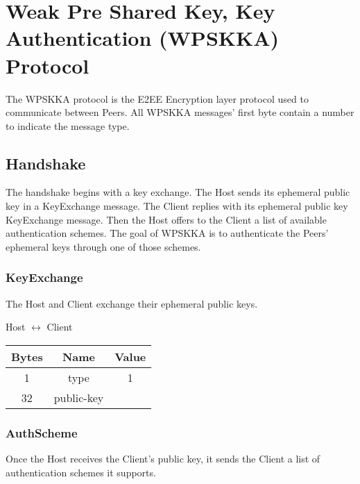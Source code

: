 \section{Weak Pre Shared Key, Key Authentication (WPSKKA) Protocol}

The WPSKKA protocol is the E2EE Encryption layer protocol used to communicate between Peers. All WPSKKA messages'
first byte contain a number to indicate
the message type.\\

\subsection{Handshake}

The handshake begins with a key exchange.
The Host sends its ephemeral public key in a KeyExchange message.
The Client replies with its ephemeral public key KeyExchange message.
Then the Host offers to the Client a list of available authentication schemes.
The goal of WPSKKA is to authenticate the Peers' ephemeral keys through one of those schemes.

\subsubsection{KeyExchange}

The Host and Client exchange their ephemeral public keys.

\begin{center}
    Host $\leftrightarrow$ Client\\
    \begin{tabular}{|c|c|c|}
        \hline
        \textbf{Bytes} & \textbf{Name} & \textbf{Value} \\
        \hline
        1              & type          & 1              \\
        \hline
        32             & public-key    &                \\
        \hline
    \end{tabular}
\end{center}

\subsubsection{AuthScheme}

Once the Host receives the Client's public key, it sends the Client a list of authentication schemes it supports.

